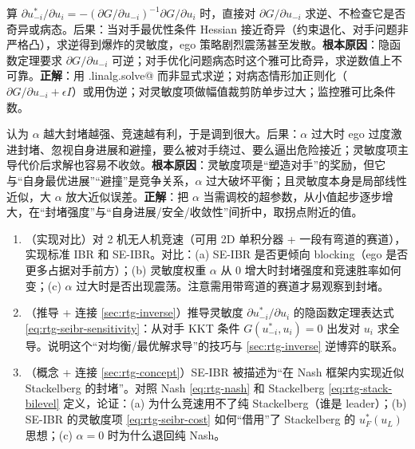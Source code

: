 \begin{pitfall}
算 $\partial u_{-i}^*/\partial u_i=-(\partial G/\partial u_{-i})^{-1}\partial G/\partial u_i$ 时，直接对 $\partial G/\partial u_{-i}$ 求逆、不检查它是否奇异或病态。后果：当对手最优性条件 Hessian 接近奇异（约束退化、对手问题非严格凸），求逆得到爆炸的灵敏度，ego 策略剧烈震荡甚至发散。\textbf{根本原因}：隐函数定理要求 $\partial G/\partial u_{-i}$ 可逆；对手优化问题病态时这个雅可比奇异，求逆数值上不可靠。\textbf{正解}：用 \verb@np.linalg.solve@ 而非显式求逆；对病态情形加正则化（$\partial G/\partial u_{-i}+\epsilon I$）或用伪逆；对灵敏度项做幅值裁剪防单步过大；监控雅可比条件数。
\end{pitfall}

\begin{pitfall}
认为 $\alpha$ 越大封堵越强、竞速越有利，于是调到很大。后果：$\alpha$ 过大时 ego 过度激进封堵、忽视自身进展和避撞，要么被对手绕过、要么逼出危险接近；灵敏度项主导代价后求解也容易不收敛。\textbf{根本原因}：灵敏度项是“塑造对手”的奖励，但它与“自身最优进展”“避撞”是竞争关系，$\alpha$ 过大破坏平衡；且灵敏度本身是局部线性近似，大 $\alpha$ 放大近似误差。\textbf{正解}：把 $\alpha$ 当需调校的超参数，从小值起步逐步增大，在“封堵强度”与“自身进展/安全/收敛性”间折中，取拐点附近的值。
\end{pitfall}

\begin{practice}
\begin{enumerate}
  \item （实现对比）对 2 机无人机竞速（可用 2D 单积分器 + 一段有弯道的赛道），实现标准 IBR 和 SE-IBR。对比：(a) SE-IBR 是否更倾向 blocking（ego 是否更多占据对手前方）；(b) 灵敏度权重 $\alpha$ 从 $0$ 增大时封堵强度和竞速胜率如何变；(c) $\alpha$ 过大时是否出现震荡。注意需用带弯道的赛道才易观察到封堵。
  \item （推导 + 连接 \cref{sec:rtg-inverse}）推导灵敏度 $\partial u_{-i}^*/\partial u_i$ 的隐函数定理表达式 \cref{eq:rtg-seibr-sensitivity}：从对手 KKT 条件 $G(u_{-i}^*,u_i)=0$ 出发对 $u_i$ 求全导。说明这个“对均衡/最优解求导”的技巧与 \cref{sec:rtg-inverse} 逆博弈的联系。
  \item （概念 + 连接 \cref{sec:rtg-concept}）SE-IBR 被描述为“在 Nash 框架内实现近似 Stackelberg 的封堵”。对照 Nash \cref{eq:rtg-nash} 和 Stackelberg \cref{eq:rtg-stack-bilevel} 定义，论证：(a) 为什么竞速用不了纯 Stackelberg（谁是 leader）；(b) SE-IBR 的灵敏度项 \cref{eq:rtg-seibr-cost} 如何“借用”了 Stackelberg 的 $u_F^*(u_L)$ 思想；(c) $\alpha=0$ 时为什么退回纯 Nash。
\end{enumerate}
\end{practice}

